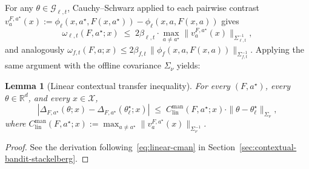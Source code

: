 \documentclass{article}
\newcommand{\cX}{\mathcal{X}}
\newcommand{\cG}{\mathcal{G}}
\newcommand{\R}{\mathbb{R}}
\newtheorem{lemma}[theorem]{Lemma}
\begin{document}
For any $\theta\in\cG_{\ell,t}$, Cauchy--Schwarz applied to each pairwise contrast $v_a^{F,a^\star}(x):=\phi_\ell(x,a^\star,F(x,a^\star))-\phi_\ell(x,a,F(x,a))$ gives
\begin{equation}
\label{eq:omega-linear}
    \omega_{\ell,t}(F,a^\star;x)\;\le\;2\beta_{\ell,t}\cdot\max_{a\neq a^\star}\|v_a^{F,a^\star}(x)\|_{\Sigma_{\ell,t}^{-1}},
\end{equation}
and analogously $\omega_{f,t}(F,a;x)\le 2\beta_{f,t}\,\|\phi_f(x,a,F(x,a))\|_{\Sigma_{f,t}^{-1}}$. Applying the same argument with the offline covariance $\Sigma_\nu$ yields:

\begin{lemma}[Linear contextual transfer inequality]
\label{lem:linear-transfer}
For every $(F,a^\star)$, every $\theta\in\R^d$, and every $x\in\cX$,
\[
    |\Delta_{F,a^\star}(\theta;x)-\Delta_{F,a^\star}(\theta_\ell^\star;x)| \;\le\; C^{\mathrm{man}}_{\mathrm{lin}}(F,a^\star;x)\cdot \|\theta-\theta_\ell^\star\|_{\Sigma_\nu},
\]
where $C^{\mathrm{man}}_{\mathrm{lin}}(F,a^\star;x) :=\max_{a\neq a^\star} \|v_a^{F,a^\star}(x)\|_{\Sigma_\nu^{-1}}$.
\end{lemma}

\begin{proof}
See the derivation following~\eqref{eq:linear-cman} in Section~\ref{sec:contextual-bandit-stackelberg}.
\end{proof}
\end{document}
